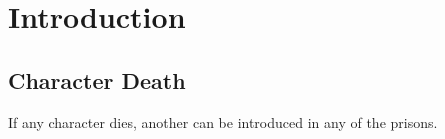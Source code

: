 \chapter{Introduction}

\section{Character Death}

\begin{multicols}{2}

If any character dies, another can be introduced in any of the prisons.

\end{multicols}

